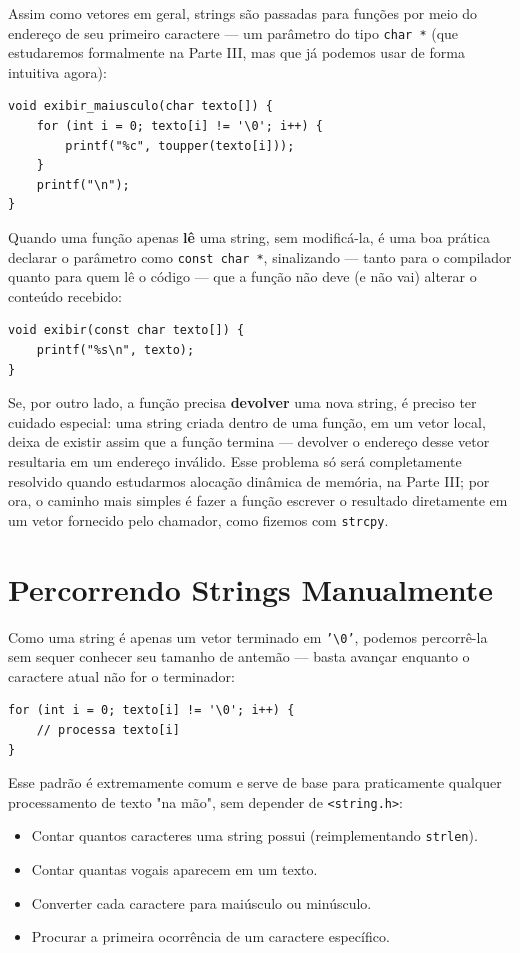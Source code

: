 \documentclass[12pt,a4paper,oneside]{extreport}
\begin{document}
Assim como vetores em geral, strings são passadas para funções por meio do endereço de seu primeiro caractere — um parâmetro do tipo \texttt{char *} (que estudaremos formalmente na Parte III, mas que já podemos usar de forma intuitiva agora):

\begin{lstlisting}
void exibir_maiusculo(char texto[]) {
    for (int i = 0; texto[i] != '\0'; i++) {
        printf("%c", toupper(texto[i]));
    }
    printf("\n");
}
\end{lstlisting}

Quando uma função apenas \textbf{lê} uma string, sem modificá-la, é uma boa prática declarar o parâmetro como \texttt{const char *}, sinalizando — tanto para o compilador quanto para quem lê o código — que a função não deve (e não vai) alterar o conteúdo recebido:

\begin{lstlisting}
void exibir(const char texto[]) {
    printf("%s\n", texto);
}
\end{lstlisting}

Se, por outro lado, a função precisa \textbf{devolver} uma nova string, é preciso ter cuidado especial: uma string criada dentro de uma função, em um vetor local, deixa de existir assim que a função termina — devolver o endereço desse vetor resultaria em um endereço inválido. Esse problema só será completamente resolvido quando estudarmos alocação dinâmica de memória, na Parte III; por ora, o caminho mais simples é fazer a função escrever o resultado diretamente em um vetor fornecido pelo chamador, como fizemos com \texttt{strcpy}.

\section{Percorrendo Strings Manualmente}

Como uma string é apenas um vetor terminado em \texttt{'\textbackslash 0'}, podemos percorrê-la sem sequer conhecer seu tamanho de antemão — basta avançar enquanto o caractere atual não for o terminador:

\begin{lstlisting}
for (int i = 0; texto[i] != '\0'; i++) {
    // processa texto[i]
}
\end{lstlisting}

Esse padrão é extremamente comum e serve de base para praticamente qualquer processamento de texto "na mão", sem depender de \texttt{<string.h>}:

\begin{itemize}
    \item Contar quantos caracteres uma string possui (reimplementando \texttt{strlen}).
    \item Contar quantas vogais aparecem em um texto.
    \item Converter cada caractere para maiúsculo ou minúsculo.
    \item Procurar a primeira ocorrência de um caractere específico.
\end{itemize}
\end{document}
